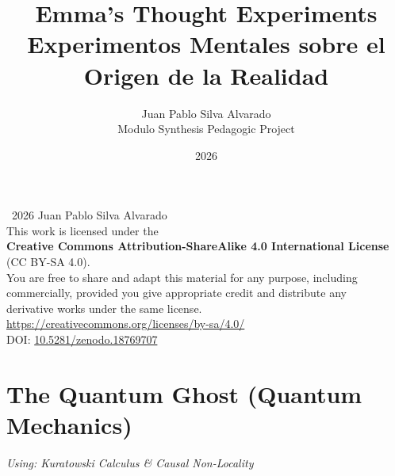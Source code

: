 \documentclass[11pt, a4paper, openany]{book}
\begin{document}
\frontmatter
\title{\Huge \textbf{Emma's Thought Experiments}\\
\Large Experimentos Mentales sobre el Origen de la Realidad}
\author{Juan Pablo Silva Alvarado\\[4pt]
\small Modulo Synthesis Pedagogic Project}

\date{2026}
\maketitle

\thispagestyle{empty}
\vspace*{\fill}
\begin{center}
\textcopyright\ 2026 Juan Pablo Silva Alvarado\\[1em]
This work is licensed under the\\[4pt]
{\bfseries Creative Commons Attribution-ShareAlike 4.0 International License}\\[4pt]
(CC BY-SA 4.0).\\[1em]
You are free to share and adapt this material for any purpose, including\\
commercially, provided you give appropriate credit and distribute any\\
derivative works under the same license.\\[1em]
\url{https://creativecommons.org/licenses/by-sa/4.0/}\\[2em]
{\small DOI: \href{https://doi.org/10.5281/zenodo.18769707}{10.5281/zenodo.18769707}}
\end{center}
\vspace*{\fill}
\clearpage

\tableofcontents

\mainmatter

\chapter{The Quantum Ghost (Quantum Mechanics)}
\textit{Using: Kuratowski Calculus \& Causal Non-Locality}
\end{document}
